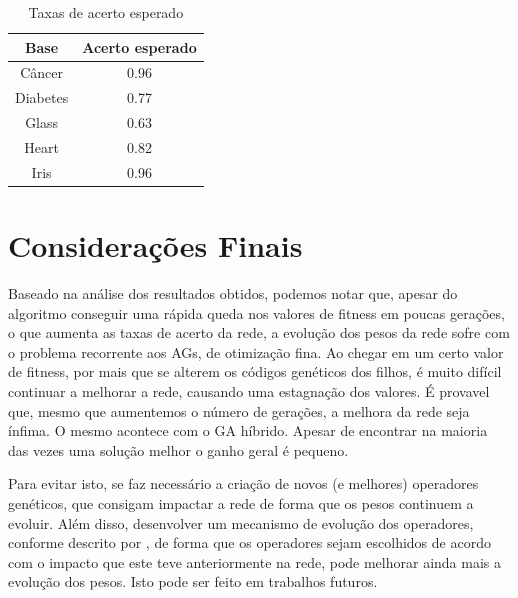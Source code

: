 \documentclass[12pt]{article}
\begin{document}
\begin{table}[ht]
\center
\begin{tabular}{|c|c|}
\hline
Base & Acerto esperado \\ \hline
Câncer & 0.96 \\ \hline
Diabetes & 0.77 \\ \hline
Glass & 0.63 \\ \hline
Heart & 0.82 \\ \hline
Iris & 0.96 \\ \hline
\end{tabular}
\caption{Taxas de acerto esperado}
\label{tab:hitaim}


\end{table}

\section{Considerações Finais}

Baseado na análise dos resultados obtidos, podemos notar que, apesar do algoritmo conseguir uma rápida queda nos valores de fitness em poucas gerações, o que aumenta as taxas de acerto da rede, a evolução dos pesos da rede sofre com o problema recorrente aos AGs, de otimização fina. Ao chegar em um certo valor de fitness, por mais que se alterem os códigos genéticos dos filhos, é muito difícil continuar a melhorar a rede, causando uma estagnação dos valores. É provavel que, mesmo que aumentemos o número de gerações, a melhora da rede seja ínfima. O mesmo acontece com o GA híbrido. Apesar de encontrar na maioria das vezes uma solução melhor o ganho geral é pequeno.

Para evitar isto, se faz necessário a criação de novos (e melhores) operadores genéticos, que consigam impactar a rede de forma que os pesos continuem a evoluir. Além disso, desenvolver um mecanismo de evolução dos operadores, conforme descrito por \cite{montana}, de forma que os operadores sejam escolhidos de acordo com o impacto que este teve anteriormente na rede, pode melhorar ainda mais a evolução dos pesos. Isto pode ser feito em trabalhos futuros.



\end{document}

